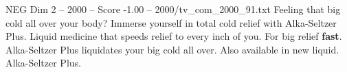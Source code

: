 \begin{textsample}{NEG Dim 2 – 2000 – Score -1.00 – 2000/tv\_com\_2000\_91.txt}  \label{ex:f2_neg_014}
Feeling that big cold all over your body?
Immerse yourself in total cold relief with Alka-Seltzer Plus.
Liquid medicine that speeds relief to every inch of you.
For big relief \textbf{fast}.
Alka-Seltzer Plus liquidates your big cold all over.
Also available in new liquid.
Alka-Seltzer Plus.

\end{textsample}
